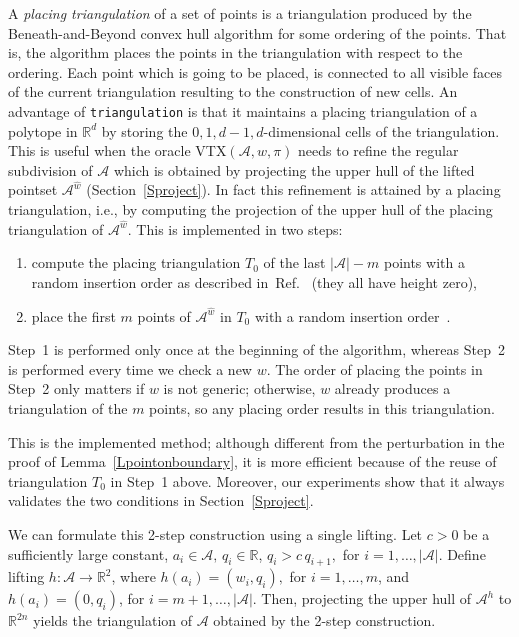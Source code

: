 \documentclass{article}
\newcommand\refcite[1]{\citealp{#1}} \newcommand\citess[1]{\textsuperscript{\textup{\citealp{#1}}}}
\def\RR{{\mathbb R}} \def\ZZ{{\mathbb Z}}
\def\A{{\mathcal A}} \def\R{{\mathcal R}}
\begin{document}
A {\it placing triangulation} of a set of points is a triangulation produced by
the Beneath-and-Beyond convex hull algorithm for some ordering of the points.
That is, the algorithm places the points in the triangulation with respect to
the ordering. Each point which is going to be placed, 
is connected to all
visible faces of the current triangulation resulting to the construction of new
cells. 
An advantage of {\tt triangulation} is that it maintains a placing
triangulation of a polytope in $\RR^d$ by storing the $0,1,d-1,d$-dimensional
cells of the triangulation. This is useful when the oracle VTX$(\A,w,\pi)$ needs
to refine the regular subdivision of $\A$ which is obtained by projecting the
upper hull of the lifted pointset $\A^{\widehat{w}}$
(Section~\ref{Sproject}).
In fact this refinement is attained by a placing triangulation, i.e., by
computing the projection of the upper hull of the placing triangulation of
$\A^{\widehat{w}}$.
This is implemented in two steps:\\[-14pt]
\begin{enumerate}[Step 1.]\itemsep0pt
 \item compute the placing triangulation $T_0$ of the last $|\A|-m$ points
with a random insertion order as described in~Ref.~\refcite{BoiDevHor09}
(they all have height zero),
 \item place the first $m$ points of $\A^{\widehat{w}}$ 
 in $T_0$ with a random insertion order~\citess{BoiDevHor09}.
\end{enumerate}
Step~1 is performed only once at the beginning of the algorithm,
whereas Step~2 is performed every time we check a new $w$.
The order of placing the points in Step~2 only matters if $w$ is not generic;
otherwise, $w$ already produces a triangulation of the $m$ points,
so any placing order results in this triangulation.

This is the implemented method; although different from the perturbation
in the proof of Lemma~\ref{Lpointonboundary}, it is more efficient
because of the reuse of triangulation $T_0$ in Step~1 above.
Moreover, our experiments show that it
always validates the two conditions in Section~\ref{Sproject}.

We can formulate this 2-step construction using a single lifting.
Let $c>0$ be a sufficiently large constant,
$a_i \in \A,\, q_i \in \RR$, $q_i > c\, q_{i+1},$ for $i=1,\ldots,|\A|$.
Define lifting $h: \A \rightarrow \RR^2$, where  $h(a_i)=(w_i,q_i),$ for
$i=1,\ldots,m$, and $h(a_i)=(0,q_i)$, for $i=m+1,\ldots,|\A|$.
Then, projecting the upper hull of $\A^h$ to $\RR^{2n}$ yields the
triangulation of $\A$ obtained by the 2-step construction.
\end{document}
